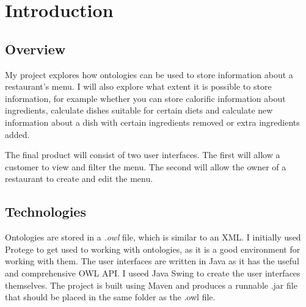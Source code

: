 \chapter{Introduction}

\section{Overview}

My project explores how ontologies can be used to store information about a restaurant's menu. 
I will also explore what extent it is possible to store information, for example whether you can store calorific information about ingredients, calculate dishes suitable for certain diets and calculate new information about a dish with certain ingredients removed or extra ingredients added.

The final product will consist of two user interfaces. The first will allow a customer to view and filter the menu. The second will allow the owner of a restaurant to create and edit the menu.

\section{Technologies}

Ontologies are stored in a \textit{.owl} file, which is similar to an XML. I initially used Protege to get used to working with ontologies, as it is a good environment for working with them. The user interfaces are written in Java as it has the useful and comprehensive OWL API\cite{owl_api}. I useed Java Swing to create the user interfaces themselves. The project is built using Maven and produces a runnable .jar file that should be placed in the same folder as the .owl file.


